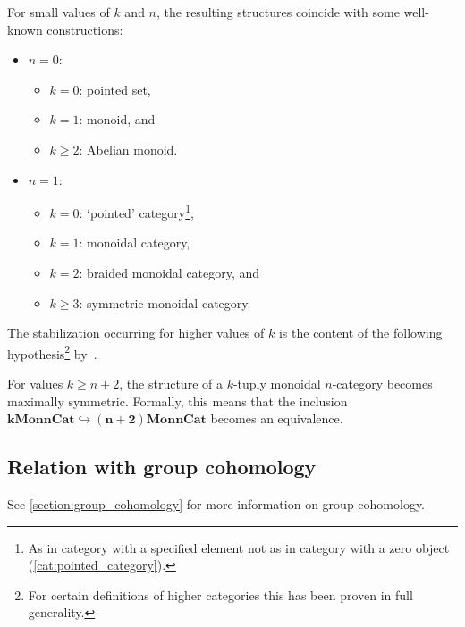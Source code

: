     \begin{example}
        For small values of $k$ and $n$, the resulting structures coincide with some well-known constructions:
        \begin{itemize}
            \item $n=0$:
                \begin{itemize}
                    \item $k=0$: pointed set,
                    \item $k=1$: monoid, and
                    \item $k\geq2$: Abelian monoid.
                \end{itemize}
            \item $n=1$:
                \begin{itemize}
                    \item $k=0$: `pointed' category\footnote{As in category with a specified element not as in category with a zero object (\cref{cat:pointed_category}).},
                    \item $k=1$: monoidal category,
                    \item $k=2$: braided monoidal category, and
                    \item $k\geq3$: symmetric monoidal category.
                \end{itemize}
        \end{itemize}
    \end{example}
    The stabilization occurring for higher values of $k$ is the content of the following hypothesis\footnote{For certain definitions of higher categories this has been proven in full generality.} by~\citet{baez_higherdimensional_1995}.
    \begin{theorem}
        For values $k\geq n+2$, the structure of a $k$-tuply monoidal $n$-category becomes maximally symmetric. Formally, this means that the inclusion \emph{$\symbf{k}\mathbf{Mon}\symbf{n}\mathbf{Cat}\hookrightarrow\symbf{(n+2)}\mathbf{Mon}\symbf{n}\mathbf{Cat}$} becomes an equivalence.
    \end{theorem}

\subsection{Relation with group cohomology}\label{section:hda_group_cohomology}

    See \cref{section:group_cohomology} for more information on group cohomology.


